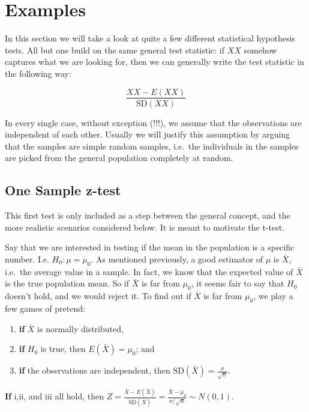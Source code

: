 \documentclass[]{book}
\providecommand{\tightlist}{%
  \setlength{\itemsep}{0pt}\setlength{\parskip}{0pt}}
\theoremstyle{definition}
\theoremstyle{definition}
\theoremstyle{definition}
\theoremstyle{remark}
\begin{document}
\hypertarget{examples-6}{%
\chapter{Examples}\label{examples-6}}

In this section we will take a look at quite a few different statistical hypothesis tests. All but one build on the same general test statistic: if \(XX\) somehow captures what we are looking for, then we can generally write the test statistic in the following way:

\[\frac{XX - E(XX)}{\text{SD}(XX)}\]

In every single case, without exception (!!!), we assume that the observations are independent of each other. Usually we will justify this assumption by arguing that the samples are simple random samples, i.e.~the individuals in the samples are picked from the general population completely at random.

\hypertarget{one-sample-z-test}{%
\section{One Sample z-test}\label{one-sample-z-test}}

This first test is only included as a step between the general concept, and the more realistic scenarios considered below. It is meant to motivate the t-test.

Say that we are interested in testing if the mean in the population is a specific number. I.e. \(H_0: \mu = \mu_0\). As mentioned previously, a good estimator of \(\mu\) is \(\bar{X}\), i.e.~the average value in a sample. In fact, we know that the expected value of \(\bar{X}\) is the true population mean. So if \(\bar{X}\) is far from \(\mu_0\), it seems fair to say that \(H_0\) doesn't hold, and we would reject it. To find out if \(\bar{X}\) is far from \(\mu_0\), we play a few games of pretend:

\begin{enumerate}
\def\labelenumi{\roman{enumi}.}
\tightlist
\item
  \textbf{if} \(\bar{X}\) is normally distributed,
\item
  \textbf{if} \(H_0\) is true, then \(E(\bar{X}) = \mu_0\); and
\item
  \textbf{if} the observations are independent, then \(\text{SD}(\bar{X}) = \frac{\sigma}{\sqrt{n}}\).
\end{enumerate}

\textbf{If} i,ii, and iii all hold, then \(Z = \frac{\bar{X} - E(\bar{X})}{\text{SD}(\bar{X})} = \frac{\bar{X} - \mu_0}{\sigma/\sqrt{n}} \sim N(0,1)\).
\end{document}
